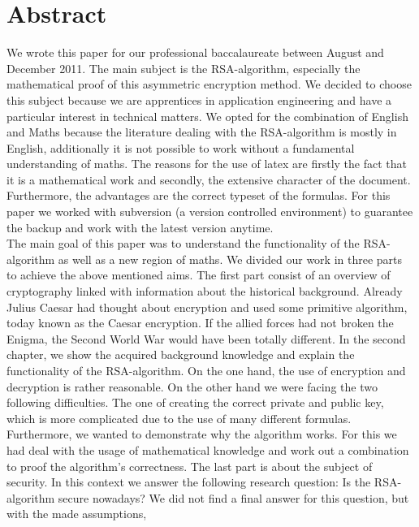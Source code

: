 \section{Abstract}
We wrote this paper for our professional baccalaureate between August and December 2011. The main subject is the RSA-algorithm, especially the mathematical proof of this asymmetric encryption method. We decided to choose this subject because we are apprentices in application engineering and have a particular interest in technical matters. We opted for the combination of English and Maths because the literature dealing with the RSA-algorithm is mostly in English, additionally it is not possible to work without a fundamental understanding of maths. The reasons for the use of latex are firstly the fact that it is a mathematical work and secondly, the extensive character of the document. Furthermore, the advantages are the correct typeset of the formulas. For this paper we worked with subversion (a version controlled environment) to guarantee the backup and work with the latest version anytime. \\
The main goal of this paper was to understand the functionality of the RSA-algorithm as well as a new region of maths. We divided our work in three parts to achieve the above mentioned aims. The first part consist of an overview of cryptography linked with information about the historical background. Already Julius Caesar had thought about encryption and used some primitive algorithm, today known as the Caesar encryption. If the allied forces had not broken the Enigma, the Second World War would have been totally different. %
In the second chapter, we show the acquired background knowledge and explain the functionality of the RSA-algorithm. 
On the one hand, the use of encryption and decryption is rather reasonable. On the other hand we were facing the two following difficulties. The one of creating the correct private and public key, which is more complicated due to the use of many different formulas. Furthermore, we wanted to demonstrate why the algorithm works. For this we had deal with the usage of mathematical knowledge and work out a combination to proof the algorithm's correctness. 
The last part is about the subject of security. In this context we answer the following research question: Is the RSA-algorithm secure nowadays? We did not find a final answer for this question, but with the made assumptions, %

